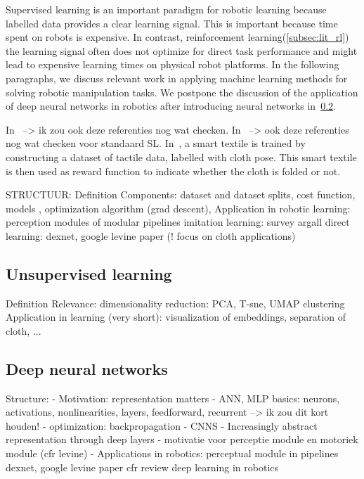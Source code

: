 \documentclass[\home/main.tex]{subfiles}
\begin{document}
Supervised learning is an important paradigm for robotic learning because labelled data provides a clear learning signal. This is important because time spent on robots is expensive. In contrast, reinforcement learning(\cref{subsec:lit_rl}) the learning signal often does not optimize for direct task performance and might lead to expensive learning times on physical robot platforms. In the following paragraphs, we discuss relevant work in applying machine learning methods for solving robotic manipulation tasks. We postpone the discussion of the application of deep neural networks in robotics after introducing neural networks in~\cref{subsec:lit_dnn}.


In~\autocite{Doumanoglou2016} --> ik zou ook deze referenties nog wat checken. 
In~\autocite{Maitin2010} --> ook deze referenties nog wat checken voor standaard SL. 
In~\autocite{Verleysen2018}, a smart textile is trained by constructing a dataset of tactile data, labelled with cloth pose. This smart textile is then used as reward function to indicate whether the cloth is folded or not. 


STRUCTUUR:
	Definition
	Components: dataset and dataset splits, cost function, models , optimization algorithm (grad descent),  
	Application in robotic learning:
		perception modules of modular pipelines
		imitation learning: survey argall 
		direct learning: dexnet, google levine paper 
		(! focus on cloth applications)

\subsection{Unsupervised learning}
Definition
Relevance:
	 dimensionality reduction: PCA, T-sne, UMAP 
	 clustering 
Application in learning (very short): visualization of embeddings, separation of cloth, ... 


\subsection{Deep neural networks} \label{subsec:lit_dnn}
Structure: 
	- Motivation: representation matters
	- ANN, MLP basics: neurons, activations, nonlinearities, layers, feedforward, recurrent --> ik zou dit kort houden! 
	- optimization: backpropagation 
	- CNNS
	- Increasingly abstract representation through deep layers 
		- motivatie voor perceptie module en motoriek module (cfr levine)
	- Applications in robotics:
		perceptual module in pipelines
		dexnet, google levine paper
		cfr review deep learning in robotics 
\end{document}
